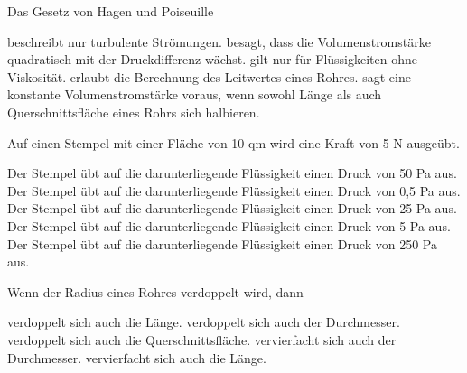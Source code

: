 \documentclass[11pt]{exam}
\begin{document}
\setlength{\voffset}{-0.5in}
\setlength{\headsep}{5pt}

\hspace{2mm}
 \hspace{5mm}
\vspace{4mm}

\begin{questions}

\question Das Gesetz von Hagen und Poiseuille

\begin{choices}
	\choice beschreibt nur turbulente Strömungen.
	\choice besagt, dass die Volumenstromstärke quadratisch mit der Druckdifferenz wächst.
	\choice gilt nur für Flüssigkeiten ohne Viskosität.
	\choice erlaubt die Berechnung des Leitwertes eines Rohres.
	\choice sagt eine konstante Volumenstromstärke voraus, wenn sowohl Länge als auch Querschnittsfläche eines Rohrs sich halbieren.
\end{choices}

\vspace{3mm}\question Auf einen Stempel mit einer Fläche von 10 qm wird eine Kraft von 5 N ausgeübt.

\begin{choices}
	\choice Der Stempel übt auf die darunterliegende Flüssigkeit einen Druck von 50 Pa aus.
	\choice Der Stempel übt auf die darunterliegende Flüssigkeit einen Druck von 0,5 Pa aus.
	\choice Der Stempel übt auf die darunterliegende Flüssigkeit einen Druck von 25 Pa aus.
	\choice Der Stempel übt auf die darunterliegende Flüssigkeit einen Druck von 5 Pa aus.
	\choice Der Stempel übt auf die darunterliegende Flüssigkeit einen Druck von 250 Pa aus.
\end{choices}

\vspace{3mm}\question Wenn der Radius eines Rohres verdoppelt wird, dann

\begin{choices}
	\choice verdoppelt sich auch die Länge.
	\choice verdoppelt sich auch der Durchmesser.
	\choice verdoppelt sich auch die Querschnittsfläche.
	\choice vervierfacht sich auch der Durchmesser.
	\choice vervierfacht sich auch die Länge.
\end{choices}


\end{questions}
\end{document}
